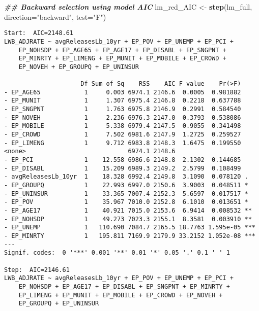 \documentclass[
  12pt,
]{article}
\newenvironment{Shaded}{\begin{snugshade}}{\end{snugshade}}
\newcommand{\AttributeTok}[1]{\textcolor[rgb]{0.13,0.29,0.53}{#1}}
\newcommand{\DocumentationTok}[1]{\textcolor[rgb]{0.56,0.35,0.01}{\textbf{\textit{#1}}}}
\newcommand{\FunctionTok}[1]{\textcolor[rgb]{0.13,0.29,0.53}{\textbf{#1}}}
\newcommand{\NormalTok}[1]{#1}
\newcommand{\OtherTok}[1]{\textcolor[rgb]{0.56,0.35,0.01}{#1}}
\newcommand{\StringTok}[1]{\textcolor[rgb]{0.31,0.60,0.02}{#1}}
\begin{document}
\begin{Shaded}
\begin{Highlighting}[]
\DocumentationTok{\#\# Backward selection using model AIC}
\NormalTok{lm\_red\_AIC }\OtherTok{\textless{}{-}} \FunctionTok{step}\NormalTok{(lm\_full, }\AttributeTok{direction=}\StringTok{"backward"}\NormalTok{, }\AttributeTok{test=}\StringTok{"F"}\NormalTok{)}
\end{Highlighting}
\end{Shaded}

\begin{verbatim}
Start:  AIC=2148.61
LWB_ADJRATE ~ avgReleasesLb_10yr + EP_POV + EP_UNEMP + EP_PCI + 
    EP_NOHSDP + EP_AGE65 + EP_AGE17 + EP_DISABL + EP_SNGPNT + 
    EP_MINRTY + EP_LIMENG + EP_MUNIT + EP_MOBILE + EP_CROWD + 
    EP_NOVEH + EP_GROUPQ + EP_UNINSUR

                     Df Sum of Sq    RSS    AIC F value    Pr(>F)    
- EP_AGE65            1     0.003 6974.1 2146.6  0.0005  0.981882    
- EP_MUNIT            1     1.307 6975.4 2146.8  0.2218  0.637788    
- EP_SNGPNT           1     1.763 6975.8 2146.9  0.2991  0.584540    
- EP_NOVEH            1     2.236 6976.3 2147.0  0.3793  0.538086    
- EP_MOBILE           1     5.338 6979.4 2147.5  0.9055  0.341498    
- EP_CROWD            1     7.502 6981.6 2147.9  1.2725  0.259527    
- EP_LIMENG           1     9.712 6983.8 2148.3  1.6475  0.199550    
<none>                            6974.1 2148.6                      
- EP_PCI              1    12.558 6986.6 2148.8  2.1302  0.144685    
- EP_DISABL           1    15.209 6989.3 2149.2  2.5799  0.108499    
- avgReleasesLb_10yr  1    18.328 6992.4 2149.8  3.1090  0.078120 .  
- EP_GROUPQ           1    22.993 6997.0 2150.6  3.9003  0.048511 *  
- EP_UNINSUR          1    33.365 7007.4 2152.3  5.6597  0.017517 *  
- EP_POV              1    35.967 7010.0 2152.8  6.1010  0.013651 *  
- EP_AGE17            1    40.921 7015.0 2153.6  6.9414  0.008532 ** 
- EP_NOHSDP           1    49.273 7023.3 2155.1  8.3581  0.003910 ** 
- EP_UNEMP            1   110.690 7084.7 2165.5 18.7763 1.595e-05 ***
- EP_MINRTY           1   195.811 7169.9 2179.9 33.2152 1.052e-08 ***
---
Signif. codes:  0 '***' 0.001 '**' 0.01 '*' 0.05 '.' 0.1 ' ' 1

Step:  AIC=2146.61
LWB_ADJRATE ~ avgReleasesLb_10yr + EP_POV + EP_UNEMP + EP_PCI + 
    EP_NOHSDP + EP_AGE17 + EP_DISABL + EP_SNGPNT + EP_MINRTY + 
    EP_LIMENG + EP_MUNIT + EP_MOBILE + EP_CROWD + EP_NOVEH + 
    EP_GROUPQ + EP_UNINSUR


\end{verbatim}
\end{document}
